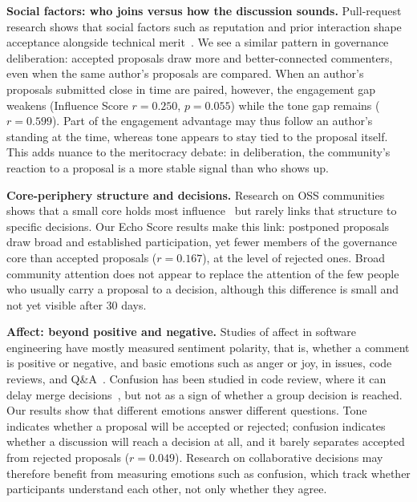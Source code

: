 \documentclass[conference]{IEEEtran}
\begin{document}
\textbf{Social factors: who joins versus how the discussion sounds.} Pull-request research shows that social factors such as reputation and prior interaction shape acceptance alongside technical merit~\cite{tsay2014influence, gousios2015work, dey2020effect}. We see a similar pattern in governance deliberation: accepted proposals draw more and better-connected commenters, even when the same author's proposals are compared. When an author's proposals submitted close in time are paired, however, the engagement gap weakens (Influence Score $r = 0.250$, $p = 0.055$) while the tone gap remains ($r = 0.599$). Part of the engagement advantage may thus follow an author's standing at the time, whereas tone appears to stay tied to the proposal itself. This adds nuance to the meritocracy debate: in deliberation, the community's reaction to a proposal is a more stable signal than who shows up.

\textbf{Core-periphery structure and decisions.} Research on OSS communities shows that a small core holds most influence~\cite{crowston2005social, crowston2006hierarchy} but rarely links that structure to specific decisions. Our Echo Score results make this link: postponed proposals draw broad and established participation, yet fewer members of the governance core than accepted proposals ($r = 0.167$), at the level of rejected ones. Broad community attention does not appear to replace the attention of the few people who usually carry a proposal to a decision, although this difference is small and not yet visible after 30 days.

\textbf{Affect: beyond positive and negative.} Studies of affect in software engineering have mostly measured sentiment polarity, that is, whether a comment is positive or negative, and basic emotions such as anger or joy, in issues, code reviews, and Q\&A~\cite{murgia2014developers, ortu2015bullies, novielli2019sentiment}. Confusion has been studied in code review, where it can delay merge decisions~\cite{ebert2017confusion, ebert2019confusion}, but not as a sign of whether a group decision is reached. Our results show that different emotions answer different questions. Tone indicates whether a proposal will be accepted or rejected; confusion indicates whether a discussion will reach a decision at all, and it barely separates accepted from rejected proposals ($r = 0.049$). Research on collaborative decisions may therefore benefit from measuring emotions such as confusion, which track whether participants understand each other, not only whether they agree.
\end{document}
